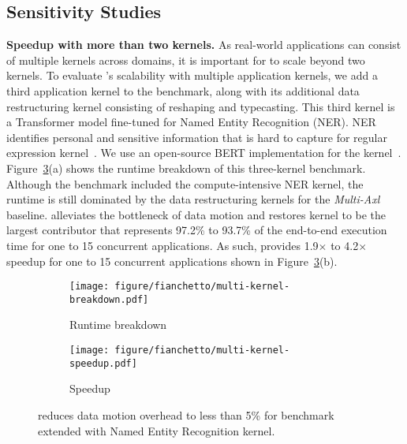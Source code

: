\subsection{Sensitivity Studies}
%
\noindent \textbf{Speedup with more than two kernels.}
%
As real-world applications can consist of multiple kernels across domains, it is important for \dmx to scale beyond two kernels. 
%
To evaluate \dmx's scalability with multiple application kernels, 
%
we add a third application kernel to the \pir benchmark, along with its additional data restructuring kernel consisting of reshaping and typecasting. 
%
This third kernel is a Transformer model fine-tuned for Named Entity Recognition (NER). NER identifies personal and sensitive information that is hard to capture for regular expression kernel~\cite{ner-transformer}.
%
We use an open-source BERT implementation for the kernel~\cite{verigoodml:iccad:2021}.
%
%
Figure~\ref{fig:res:multi-kernel}(a) shows the runtime breakdown of this three-kernel benchmark. 
%
Although the benchmark included the compute-intensive NER kernel, the runtime is still dominated by the data restructuring kernels for the \emph{Multi-Axl} baseline.
%
\dmx alleviates the bottleneck of data motion and restores kernel to be the largest contributor that represents 97.2\% to 93.7\% of the end-to-end execution time for one to 15 concurrent applications.  
%
As such, \dmx provides 1.9$\times$ to 4.2$\times$ speedup for one to 15 concurrent applications shown in Figure~\ref{fig:res:multi-kernel}(b).

\begin{figure}[t!]
\begin{subfigure}[ht!]{\columnwidth}
\centering
\texttt{[image: figure/fianchetto/multi-kernel-breakdown.pdf]}
\caption{Runtime breakdown}
\label{fig:res:multi-kernel-breakdown}
\end{subfigure}
%
\begin{subfigure}[ht!]{\columnwidth}
\centering
\hspace{-0.75cm}
\texttt{[image: figure/fianchetto/multi-kernel-speedup.pdf]}
\caption{Speedup}
\label{fig:res:multi-kernel-speedup}
\end{subfigure}
%
\caption{\dmx reduces data motion overhead to less than 5\% for \pir benchmark extended with Named Entity Recognition kernel.
}
\label{fig:res:multi-kernel}
\vspace{-3ex}
\end{figure}

